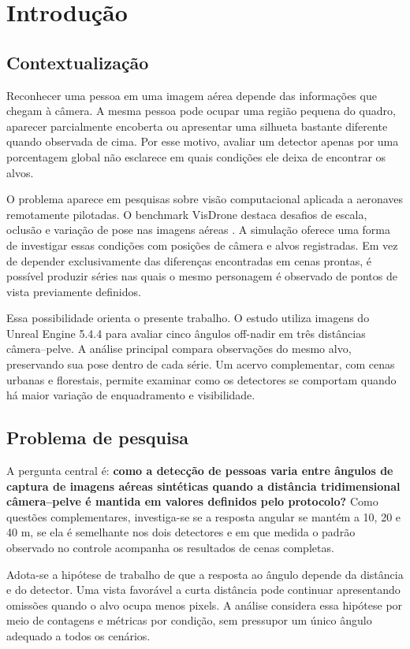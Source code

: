 \chapter{Introdução}
\section{Contextualização}
Reconhecer uma pessoa em uma imagem aérea depende das informações que chegam à câmera. A mesma pessoa pode ocupar uma região pequena do quadro, aparecer parcialmente encoberta ou apresentar uma silhueta bastante diferente quando observada de cima. Por esse motivo, avaliar um detector apenas por uma porcentagem global não esclarece em quais condições ele deixa de encontrar os alvos.

O problema aparece em pesquisas sobre visão computacional aplicada a aeronaves remotamente pilotadas. O benchmark VisDrone destaca desafios de escala, oclusão e variação de pose nas imagens aéreas \cite{drone_detection}. A simulação oferece uma forma de investigar essas condições com posições de câmera e alvos registradas. Em vez de depender exclusivamente das diferenças encontradas em cenas prontas, é possível produzir séries nas quais o mesmo personagem é observado de pontos de vista previamente definidos.

Essa possibilidade orienta o presente trabalho. O estudo utiliza imagens do Unreal Engine 5.4.4 para avaliar cinco ângulos off-nadir em três distâncias câmera--pelve. A análise principal compara observações do mesmo alvo, preservando sua pose dentro de cada série. Um acervo complementar, com cenas urbanas e florestais, permite examinar como os detectores se comportam quando há maior variação de enquadramento e visibilidade.

\section{Problema de pesquisa}
A pergunta central é: \textbf{como a detecção de pessoas varia entre ângulos de captura de imagens aéreas sintéticas quando a distância tridimensional câmera--pelve é mantida em valores definidos pelo protocolo?} Como questões complementares, investiga-se se a resposta angular se mantém a 10, 20 e 40 m, se ela é semelhante nos dois detectores e em que medida o padrão observado no controle acompanha os resultados de cenas completas.

Adota-se a hipótese de trabalho de que a resposta ao ângulo depende da distância e do detector. Uma vista favorável a curta distância pode continuar apresentando omissões quando o alvo ocupa menos pixels. A análise considera essa hipótese por meio de contagens e métricas por condição, sem pressupor um único ângulo adequado a todos os cenários.

